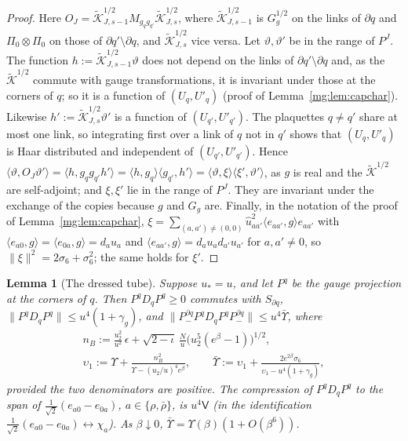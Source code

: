 \documentclass[11pt,a4paper]{article}
\newtheorem{lemma}[theorem]{Lemma}
\theoremstyle{definition}
\theoremstyle{remark}
\newcommand{\ip}[2]{\langle #1,#2\rangle}
\newcommand{\norm}[1]{\lVert #1\rVert}
\begin{document}
\begin{proof}
Here $O_J=\tilde{\mathcal K}^{1/2}_{J,s-1}M_{g_qg_{q'}}\tilde{\mathcal K}^{1/2}_{J,s}$, where $\tilde{\mathcal K}^{1/2}_{J,s-1}$ is $G_g^{1/2}$ on the links of $\partial q$ and
$\Pi_0\otimes\Pi_0$ on those of $\partial q'\setminus\partial q$, and $\tilde{\mathcal K}^{1/2}_{J,s}$ vice versa. Let $\vartheta,\vartheta'$ be in the range of $P^J$. The
function $h:=\tilde{\mathcal K}^{1/2}_{J,s-1}\vartheta$ does not depend on the links of $\partial q'\setminus\partial q$ and, as the $\tilde{\mathcal K}^{1/2}$ commute with
gauge transformations, it is invariant under those at the corners of $q$; so it is a function of $(U_q,U'_q)$ (proof of Lemma~\ref{mg:lem:capchar}).
Likewise $h':=\tilde{\mathcal K}^{1/2}_{J,s}\vartheta'$ is a function of $(U_{q'},U'_{q'})$. The plaquettes $q\ne q'$ share at most one link, so integrating
first over a link of $q$ not in $q'$ shows that $(U_q,U'_q)$ is Haar distributed and independent of $(U_{q'},U'_{q'})$. Hence
$\ip\vartheta{O_J\vartheta'}=\ip h{g_qg_{q'}h'}=\ip h{g_q}\ip{g_{q'}}{h'}=\ip\vartheta\xi\ip{\xi'}{\vartheta'}$, as $g$ is real and the $\tilde{\mathcal K}^{1/2}$ are self-adjoint; and
$\xi,\xi'$ lie in the range of $P^J$. They are invariant under the exchange of the copies because $g$ and $G_g$ are. Finally, in the notation of the
proof of Lemma~\ref{mg:lem:capchar}, $\xi=\sum_{(a,a')\ne(0,0)}\hat u_{aa'}^2\ip{e_{aa'}}{g}e_{aa'}$ with $\ip{e_{a0}}g=\ip{e_{0a}}g=d_au_a$ and
$\ip{e_{aa'}}g=d_au_ad_{a'}u_{a'}$ for $a,a'\ne0$, so $\norm\xi^2=2\sigma_6+\sigma_6^2$; the same holds for $\xi'$.
\end{proof}

\begin{lemma}[The dressed tube]\label{mg:lem:dressed}
Suppose $u_*=u$, and let $P^q$ be the gauge projection at the corners of $q$. Then $P^qD_qP^q\ge0$ commutes with $S_{\partial q}$,
$\norm{P^qD_qP^q}\le u^4(1+\gamma_g)$, and $\norm{P^{\partial q}_-P^qD_qP^qP^{\partial q}_-}\le u^4\bar\Upsilon$, where
\begin{gather*}
n_B:=\frac{u_2^2}{u^2}\,\epsilon+\sqrt{2-\iota}\,\frac Nu\bigl(u_2^5(e^\beta-1)\bigr)^{1/2},\\
\upsilon_1:=\Upsilon+\frac{n_B^2}{\Upsilon-(u_2/u)^4e^\beta},\qquad\bar\Upsilon:=\upsilon_1+\frac{2e^{2\beta}\sigma_6}{\upsilon_1-u^4(1+\gamma_g)},
\end{gather*}
provided the two denominators are positive. The compression of $P^qD_qP^q$ to the span of $\frac1{\sqrt2}(e_{a0}-e_{0a})$, $a\in\{\rho,\bar\rho\}$, is
$u^4\mathsf V$ (in the identification $\frac1{\sqrt2}(e_{a0}-e_{0a})\leftrightarrow\chi_a$). As $\beta\downarrow0$, $\bar\Upsilon=\Upsilon(\beta)(1+O(\beta^6))$.
\end{lemma}
\end{document}
